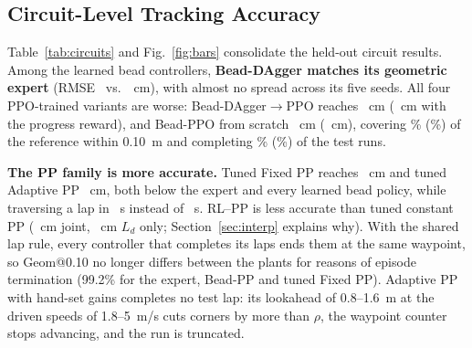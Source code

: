 \documentclass[conference]{IEEEtran}
\begin{document}
\begin{table}[t]
\centering
\caption{Tracking Performance on the Eight Held-Out Test Circuits (Mean over Circuits, Five Episodes Each; Learned Controllers: Mean over Five Training Seeds with the Range across Seeds in Brackets; Best Accuracy per Column in Bold; Time and Speed Not Ranked)}
\label{tab:circuits}
\footnotesize
\setlength{\tabcolsep}{3.2pt}
\end{table}

\subsection{Circuit-Level Tracking Accuracy}
Table~\ref{tab:circuits} and Fig.~\ref{fig:bars} consolidate the held-out circuit results. Among the learned bead controllers, \textbf{Bead-DAgger matches its geometric expert} (RMSE \VrmseDagger~vs.\ \VrmseExpert~cm), with almost no spread across its five seeds. All four PPO-trained variants are worse: Bead-DAgger$\to$PPO reaches \VrmseDP~cm (\VrmseDPacc~cm with the progress reward), and Bead-PPO from scratch \VrmsePPO~cm (\VrmsePPOacc~cm), covering \VgPPO\% (\VgPPOacc\%) of the reference within 0.10~m and completing \VcompPPO\% (\VcompPPOacc\%) of the test runs.

\textbf{The PP family is more accurate.} Tuned Fixed PP reaches \VrmseFix~cm and tuned Adaptive PP \VrmseAd~cm, both below the expert and every learned bead policy, while traversing a lap in \VtFix~s instead of \VtExpert~s. RL--PP is less accurate than tuned constant PP (\VrmseRL~cm joint, \VrmseRLld~cm $L_d$ only; Section~\ref{sec:interp} explains why). With the shared lap rule, every controller that completes its laps ends them at the same waypoint, so Geom@0.10 no longer differs between the plants for reasons of episode termination (99.2\% for the expert, Bead-PP and tuned Fixed PP). Adaptive PP with hand-set gains completes no test lap: its lookahead of 0.8--1.6~m at the driven speeds of 1.8--5~m/s cuts corners by more than $\rho$, the waypoint counter stops advancing, and the run is truncated.
\end{document}
